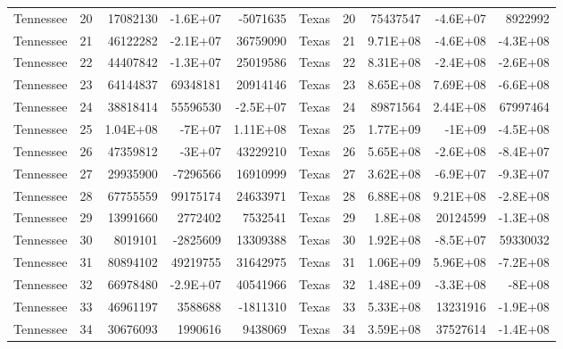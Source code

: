 \begin{landscape}
\begin{singlespace}
\begin{longtable}{lrrrr|lrrrr}
		Tennessee &  20 & 17082130 & -1.6E+07 & -5071635 & Texas &  20 & 75437547 & -4.6E+07 & 8922992 \\
		Tennessee &  21 & 46122282 & -2.1E+07 & 36759090 & Texas &  21 & 9.71E+08 & -4.6E+08 & -4.3E+08 \\
		Tennessee &  22 & 44407842 & -1.3E+07 & 25019586 & Texas &  22 & 8.31E+08 & -2.4E+08 & -2.6E+08 \\
		Tennessee &  23 & 64144837 & 69348181 & 20914146 & Texas &  23 & 8.65E+08 & 7.69E+08 & -6.6E+08 \\
		Tennessee &  24 & 38818414 & 55596530 & -2.5E+07 & Texas &  24 & 89871564 & 2.44E+08 & 67997464 \\
		Tennessee &  25 & 1.04E+08 & -7E+07 & 1.11E+08 & Texas &  25 & 1.77E+09 & -1E+09 & -4.5E+08 \\
		Tennessee &  26 & 47359812 & -3E+07 & 43229210 & Texas &  26 & 5.65E+08 & -2.6E+08 & -8.4E+07 \\
		Tennessee &  27 & 29935900 & -7296566 & 16910999 & Texas &  27 & 3.62E+08 & -6.9E+07 & -9.3E+07 \\
		Tennessee &  28 & 67755559 & 99175174 & 24633971 & Texas &  28 & 6.88E+08 & 9.21E+08 & -2.8E+08 \\
		Tennessee &  29 & 13991660 & 2772402 & 7532541 & Texas &  29 & 1.8E+08 & 20124599 & -1.3E+08 \\
		Tennessee &  30 & 8019101 & -2825609 & 13309388 & Texas &  30 & 1.92E+08 & -8.5E+07 & 59330032 \\
		Tennessee &  31 & 80894102 & 49219755 & 31642975 & Texas &  31 & 1.06E+09 & 5.96E+08 & -7.2E+08 \\
		Tennessee &  32 & 66978480 & -2.9E+07 & 40541966 & Texas &  32 & 1.48E+09 & -3.3E+08 & -8E+08 \\
		Tennessee &  33 & 46961197 & 3588688 & -1811310 & Texas &  33 & 5.33E+08 & 13231916 & -1.9E+08 \\
		Tennessee &  34 & 30676093 & 1990616 & 9438069 & Texas &  34 & 3.59E+08 & 37527614 & -1.4E+08\\


\end{longtable}
\end{singlespace}
\end{landscape}
